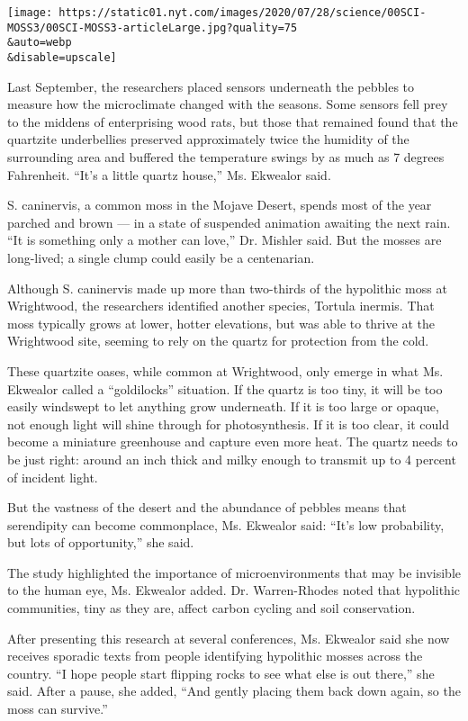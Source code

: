 \texttt{[image: https://static01.nyt.com/images/2020/07/28/science/00SCI-MOSS3/00SCI-MOSS3-articleLarge.jpg?quality=75\\\&auto=webp\\\&disable=upscale]}

Last September, the researchers placed sensors underneath the pebbles to
measure how the microclimate changed with the seasons. Some sensors fell
prey to the middens of enterprising wood rats, but those that remained
found that the quartzite underbellies preserved approximately twice the
humidity of the surrounding area and buffered the temperature swings by
as much as 7 degrees Fahrenheit. ``It's a little quartz house,'' Ms.
Ekwealor said.

S. caninervis, a common moss in the Mojave Desert, spends most of the
year parched and brown --- in a state of suspended animation awaiting
the next rain. ``It is something only a mother can love,'' Dr. Mishler
said. But the mosses are long-lived; a single clump could easily be a
centenarian.

Although S. caninervis made up more than two-thirds of the hypolithic
moss at Wrightwood, the researchers identified another species, Tortula
inermis. That moss typically grows at lower, hotter elevations, but was
able to thrive at the Wrightwood site, seeming to rely on the quartz for
protection from the cold.

These quartzite oases, while common at Wrightwood, only emerge in what
Ms. Ekwealor called a ``goldilocks'' situation. If the quartz is too
tiny, it will be too easily windswept to let anything grow underneath.
If it is too large or opaque, not enough light will shine through for
photosynthesis. If it is too clear, it could become a miniature
greenhouse and capture even more heat. The quartz needs to be just
right: around an inch thick and milky enough to transmit up to 4 percent
of incident light.

But the vastness of the desert and the abundance of pebbles means that
serendipity can become commonplace, Ms. Ekwealor said: ``It's low
probability, but lots of opportunity,'' she said.

The study highlighted the importance of microenvironments that may be
invisible to the human eye, Ms. Ekwealor added. Dr. Warren-Rhodes noted
that hypolithic communities, tiny as they are, affect carbon cycling and
soil conservation.

After presenting this research at several conferences, Ms. Ekwealor said
she now receives sporadic texts from people identifying hypolithic
mosses across the country. ``I hope people start flipping rocks to see
what else is out there,'' she said. After a pause, she added, ``And
gently placing them back down again, so the moss can survive.''

